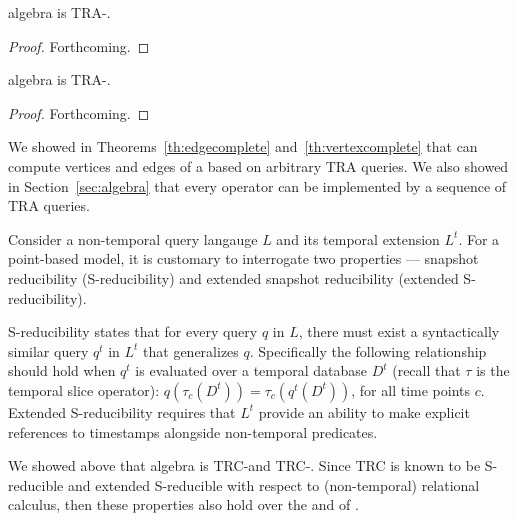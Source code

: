 \begin{theorem}
\ql algebra is TRA-\edgec.
\label{th:edgecomplete}
\end{theorem}

\begin{proof}  Forthcoming.
\end{proof}

\begin{theorem}
\ql algebra is TRA-\vertexc.
\label{th:vertexcomplete}
\end{theorem}

\begin{proof}  Forthcoming.
\end{proof}

We showed in Theorems~\ref{th:edgecomplete}
and~\ref{th:vertexcomplete} that \ql can compute vertices and edges of
a \tg based on arbitrary TRA queries.  We also showed in
Section~\ref{sec:algebra} that every \ql operator can be implemented
by a sequence of TRA queries.

Consider a non-temporal query langauge $L$ and its temporal extension
$L^t$.  For a point-based model, it is customary to interrogate two
properties --- snapshot reducibility (S-reducibility) and extended
snapshot reducibility (extended S-reducibility).

S-reducibility states that for every query $q$ in $L$, there must
exist a syntactically similar query $q^t$ in $L^t$ that generalizes
$q$.  Specifically the following relationship should hold when $q^t$
is evaluated over a temporal database $D^t$ (recall that $\tau$ is the
temporal slice operator): $q(\tau_c(D^t)) = \tau_c(q^t(D^t))$, for all
time points $c$.  Extended S-reducibility requires that $L^t$ provide
an ability to make explicit references to timestamps alongside
non-temporal predicates.

We showed above that \ql algebra is TRC-\edgec and TRC-\vertexc.
Since TRC is known to be S-reducible and extended S-reducible with
respect to (non-temporal) relational calculus, then these properties
also hold over the \edgeq and \vertexq of \ql.



